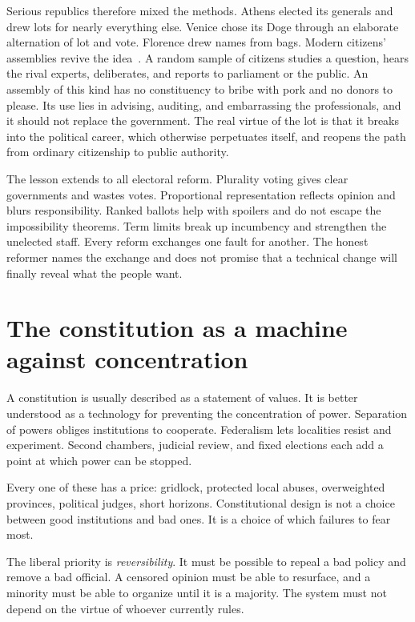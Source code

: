 \documentclass[12pt,a4paper]{book}
\begin{document}
Serious republics therefore mixed the methods. Athens elected its generals and drew lots for nearly everything else. Venice chose its Doge through an elaborate alternation of lot and vote. Florence drew names from bags. Modern citizens' assemblies revive the idea~\cite{Sintomer2016,Bouricius2013}. A random sample of citizens studies a question, hears the rival experts, deliberates, and reports to parliament or the public. An assembly of this kind has no constituency to bribe with pork and no donors to please. Its use lies in advising, auditing, and embarrassing the professionals, and it should not replace the government. The real virtue of the lot is that it breaks into the political career, which otherwise perpetuates itself, and reopens the path from ordinary citizenship to public authority.

The lesson extends to all electoral reform. Plurality voting gives clear governments and wastes votes. Proportional representation reflects opinion and blurs responsibility. Ranked ballots help with spoilers and do not escape the impossibility theorems. Term limits break up incumbency and strengthen the unelected staff. Every reform exchanges one fault for another. The honest reformer names the exchange and does not promise that a technical change will finally reveal what the people want.

\section{The constitution as a machine against concentration}

A constitution is usually described as a statement of values. It is better understood as a technology for preventing the concentration of power. Separation of powers obliges institutions to cooperate. Federalism lets localities resist and experiment. Second chambers, judicial review, and fixed elections each add a point at which power can be stopped.

Every one of these has a price: gridlock, protected local abuses, overweighted provinces, political judges, short horizons. Constitutional design is not a choice between good institutions and bad ones. It is a choice of which failures to fear most.

The liberal priority is \emph{reversibility}. It must be possible to repeal a bad policy and remove a bad official. A censored opinion must be able to resurface, and a minority must be able to organize until it is a majority. The system must not depend on the virtue of whoever currently rules.
\end{document}
